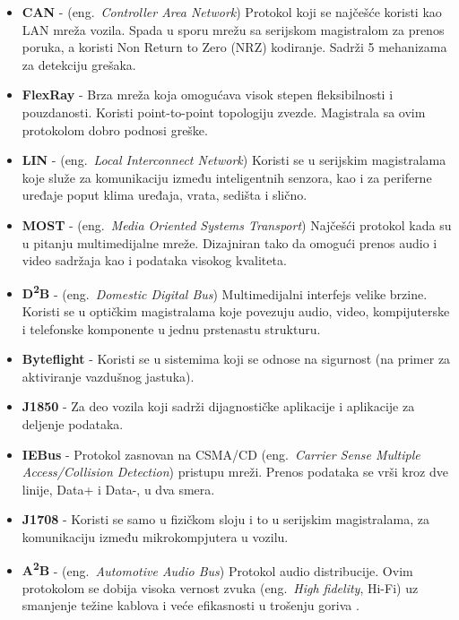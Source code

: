 \documentclass[a4paper]{article}
\begin{document}
\begin{itemize}

\item \textbf{CAN} - (eng.~{\em Controller Area Network}) Protokol koji se najčešće koristi kao LAN mreža vozila. Spada u sporu mrežu sa serijskom magistralom za prenos poruka, a koristi Non Return to Zero (NRZ) kodiranje. Sadrži 5 mehanizama za detekciju grešaka.
\item \textbf{FlexRay} - Brza mreža koja omogućava visok stepen fleksibilnosti i pouzdanosti. Koristi point-to-point topologiju zvezde. Magistrala sa ovim protokolom dobro podnosi greške. 
\item \textbf{LIN} - (eng.~{\em Local Interconnect Network}) Koristi se u serijskim magistralama koje služe za komunikaciju između inteligentnih senzora, kao i za periferne uređaje poput klima uređaja, vrata, sedišta i slično. 
\item \textbf{MOST} - (eng.~{\em Media Oriented Systems Transport}) Najčešći protokol kada su u pitanju multimedijalne mreže. Dizajniran tako da omogući prenos audio i video sadržaja kao i podataka visokog kvaliteta. 
\item \textbf{D\textsuperscript{2}B} - (eng.~{\em Domestic Digital Bus}) Multimedijalni interfejs velike brzine. Koristi se u optičkim magistralama koje povezuju audio, video, kompijuterske i telefonske komponente u jednu prstenastu strukturu.  
\item \textbf{Byteflight} - Koristi se u sistemima koji se odnose na sigurnost (na primer za aktiviranje vazdušnog jastuka).
\item \textbf{J1850} - Za deo vozila koji sadrži dijagnostičke aplikacije i aplikacije za deljenje podataka. 
\item \textbf{IEBus} - Protokol zasnovan na CSMA/CD (eng.~{\em Carrier Sense Multiple Access/Collision Detection}) pristupu mreži. Prenos podataka se vrši kroz dve linije, Data+ i Data-, u dva smera. 
\item \textbf{J1708} - Koristi se samo u fizičkom sloju i to u serijskim magistralama, za komunikaciju između mikrokompjutera u vozilu.
\item \textbf{A\textsuperscript{2}B}  - (eng.~{\em Automotive Audio Bus}) Protokol audio distribucije. Ovim protokolom se dobija visoka vernost zvuka (eng.~{\em High fidelity}, Hi-Fi) uz smanjenje težine kablova i veće efikasnosti u trošenju goriva \cite{AB}.  


\end{itemize}
\end{document}
